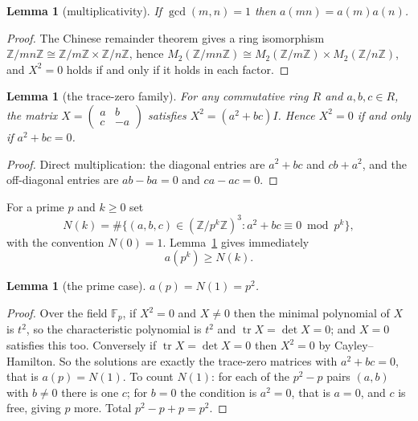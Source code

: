\documentclass[11pt,a4paper]{article}
\theoremstyle{plain}
\newtheorem{lemma}[theorem]{Lemma}
\theoremstyle{definition}
\begin{document}
\begin{lemma}[multiplicativity]\label{lem:mult}
If $\gcd(m,n)=1$ then $a(mn)=a(m)a(n)$.
\end{lemma}

\begin{proof}
The Chinese remainder theorem gives a ring isomorphism
$\mathbb{Z}/mn\mathbb{Z}\cong\mathbb{Z}/m\mathbb{Z}\times\mathbb{Z}/n\mathbb{Z}$, hence
$M_{2}(\mathbb{Z}/mn\mathbb{Z})\cong M_{2}(\mathbb{Z}/m\mathbb{Z})\times
M_{2}(\mathbb{Z}/n\mathbb{Z})$, and $X^{2}=0$ holds if and only if it holds in each factor.
\end{proof}

\begin{lemma}[the trace-zero family]\label{lem:trace}
For any commutative ring $R$ and $a,b,c\in R$, the matrix
$X=\begin{pmatrix}a&b\\c&-a\end{pmatrix}$ satisfies $X^{2}=(a^{2}+bc)I$. Hence $X^{2}=0$ if
and only if $a^{2}+bc=0$.
\end{lemma}

\begin{proof}
Direct multiplication: the diagonal entries are $a^{2}+bc$ and $cb+a^{2}$, and the
off-diagonal entries are $ab-ba=0$ and $ca-ac=0$.
\end{proof}

For a prime $p$ and $k\ge0$ set
\[
  N(k)=\#\bigl\{(a,b,c)\in(\mathbb{Z}/p^{k}\mathbb{Z})^{3}:a^{2}+bc\equiv0\bmod p^{k}\bigr\},
\]
with the convention $N(0)=1$. Lemma~\ref{lem:trace} gives immediately
\begin{equation}\label{eq:lower}
  a(p^{k})\ge N(k).
\end{equation}

\begin{lemma}[the prime case]\label{lem:prime}
$a(p)=N(1)=p^{2}$.
\end{lemma}

\begin{proof}
Over the field $\mathbb{F}_{p}$, if $X^{2}=0$ and $X\ne0$ then the minimal polynomial of
$X$ is $t^{2}$, so the characteristic polynomial is $t^{2}$ and $\operatorname{tr}X=\det
X=0$; and $X=0$ satisfies this too. Conversely if $\operatorname{tr}X=\det X=0$ then
$X^{2}=0$ by Cayley--Hamilton. So the solutions are exactly the trace-zero matrices with
$a^{2}+bc=0$, that is $a(p)=N(1)$. To count $N(1)$: for each of the $p^{2}-p$ pairs $(a,b)$
with $b\ne0$ there is one $c$; for $b=0$ the condition is $a^{2}=0$, that is $a=0$, and $c$
is free, giving $p$ more. Total $p^{2}-p+p=p^{2}$.
\end{proof}
\end{document}
